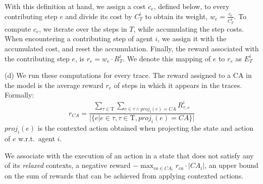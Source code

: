 \documentclass[runningheads]{llncs}
\newcommand{\citep}{\cite}
\newcommand{\mcact}[1]{{\mathit{CA}_#1}}
\newcommand{\Tau}{\mathrm{T}}
\begin{document}
{{With this definition at hand, we assign a cost $c_e$,
defined below, to every contributing step $e$ and divide its cost by $C_T^i$ to obtain its weight, $w_e=\frac{c_e}{C_T^i}$.
To compute $c_e$, we iterate over the steps in $T$, while accumulating the step costs. When encountering a contributing step of agent $i$, we assign it with the accumulated cost, and reset the accumulation. 
Finally, the reward associated with the 
contributing step $e$, is $r_e = w_e \cdot R_T^i$. We denote this mapping of $e$ to $r_e$ as $E_T^i$
}

\noindent (d) We run these computations for every trace.
 The reward assigned to a CA in the model is the average reward 
$r_e$ of steps in which it appears in the traces.
Formally:
\begin{equation}
    r_{CA} = \frac{\sum\limits_{\tau\in\Tau} \sum\limits_{e\in\tau \land proj_i(e)=CA} R^i_{\tau,e}}
   {|\{ e|e\in\tau, \tau\in\Tau, proj_i(e)=CA \}|}
\end{equation}
$proj_i(e)$ is the  contexted action obtained when projecting the state and action of $e$ w.r.t.~agent $i$.



We associate with the execution of an action
in a state that does not satisfy any of its {\em relaxed} contexts, 
a negative reward $-\max_{ca \in \mcact{i}} r_{ca} \cdot \lvert \mcact{i}\rvert $, %
an upper bound on the sum of rewards that can be achieved from applying contexted actions. 

}
\end{document}
